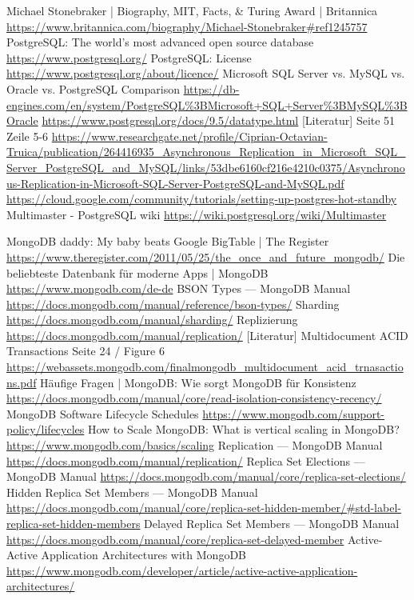 \begin{thebibliography}{HR08}
         Michael Stonebraker | Biography, MIT, Facts, \& Turing Award | Britannica \url{https://www.britannica.com/biography/Michael-Stonebraker#ref1245757}
         PostgreSQL: The world's most advanced open source database \url{https://www.postgresql.org/}
         PostgreSQL: License \url{https://www.postgresql.org/about/licence/}
         Microsoft SQL Server vs. MySQL vs. Oracle vs. PostgreSQL Comparison \url{https://db-engines.com/en/system/PostgreSQL%3BMicrosoft+SQL+Server%3BMySQL%3BOracle}
         \url{https://www.postgresql.org/docs/9.5/datatype.html}
         [Literatur] Seite 51 Zeile 5-6 \url{https://www.researchgate.net/profile/Ciprian-Octavian-Truica/publication/264416935_Asynchronous_Replication_in_Microsoft_SQL_Server_PostgreSQL_and_MySQL/links/53dbe6160cf216e4210c0375/Asynchronous-Replication-in-Microsoft-SQL-Server-PostgreSQL-and-MySQL.pdf}
         \url{https://cloud.google.com/community/tutorials/setting-up-postgres-hot-standby}
         Multimaster - PostgreSQL wiki \url{https://wiki.postgresql.org/wiki/Multimaster}

         MongoDB daddy: My baby beats Google BigTable | The Register \url{https://www.theregister.com/2011/05/25/the_once_and_future_mongodb/}
         Die beliebteste Datenbank für moderne Apps | MongoDB \url{https://www.mongodb.com/de-de}
         BSON Types — MongoDB Manual \url{https://docs.mongodb.com/manual/reference/bson-types/}
         Sharding \url{https://docs.mongodb.com/manual/sharding/}
         Replizierung \url{https://docs.mongodb.com/manual/replication/}
         [Literatur] Multidocument ACID Transactions Seite 24 / Figure 6 \url{https://webassets.mongodb.com/finalmongodb_multidocument_acid_trnasactions.pdf}
         Häufige Fragen | MongoDB: Wie sorgt MongoDB für Konsistenz \url{https://docs.mongodb.com/manual/core/read-isolation-consistency-recency/}
         MongoDB Software Lifecycle Schedules \url{https://www.mongodb.com/support-policy/lifecycles}
         How to Scale MongoDB: What is vertical scaling in MongoDB? \url{https://www.mongodb.com/basics/scaling}
         Replication — MongoDB Manual \url{https://docs.mongodb.com/manual/replication/}
         Replica Set Elections — MongoDB Manual \url{https://docs.mongodb.com/manual/core/replica-set-elections/}
         Hidden Replica Set Members — MongoDB Manual \url{https://docs.mongodb.com/manual/core/replica-set-hidden-member/#std-label-replica-set-hidden-members}
         Delayed Replica Set Members — MongoDB Manual \url{https://docs.mongodb.com/manual/core/replica-set-delayed-member}
         Active-Active Application Architectures with MongoDB \url{https://www.mongodb.com/developer/article/active-active-application-architectures/}


\end{thebibliography}
